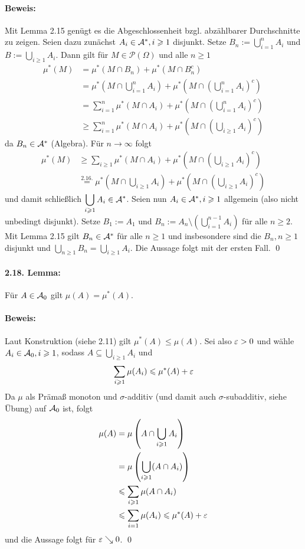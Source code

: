 \paragraph{Beweis:}Mit Lemma 2.15 gen\"ugt es die Abgeschlossenheit bzgl. abz\"ahlbarer Durchschnitte zu zeigen. Seien dazu zun\"achst $A_i\in\mathcal{A}^*,i\geqslant1$ disjunkt. Setze $B_n:=\displaystyle\bigcup_{i=1}^nA_i$ und $\displaystyle B:=\bigcup_{i\geq1}A_i$. Dann gilt f\"ur $M\in\mathcal{P}(\Omega)$ und alle $n\geq1$
\begin{align*}
    \mu^*(M)&=\mu^*(M\cap B_n)+\mu^*(M\cap B_n^c)\\
    &=\mu^*\left(M\cap\bigcup_{i=1}^nA_i\right)+\mu^*\left(M\cap\left(\bigcup_{i=1}^nA_i\right)^c\right)\\
    &=\sum_{i=1}^n\mu^*(M\cap A_i)+\mu^*\left(M\cap\left(\bigcup_{i=1}^nA_i\right)^c\right)\\
    &\geq\sum_{i=1}^n\mu^*(M\cap A_i)+\mu^*\left(M\cap\left(\bigcup_{i\geq1}A_i\right)^c\right)
\end{align*}
da $B_n\in\mathcal{A}^*$ (Algebra). F\"ur $n\to\infty$ folgt 
\begin{align*}
    \mu^*(M)&\geq\sum_{i\geq1}\mu^*(M\cap A_i)+\mu^*\left(M\cap\left(\bigcup_{i\geq1}A_i\right)^c\right)\\
    &\overset{2.16.}{=}\mu^*\left(M\cap\bigcup_{i\geq1}A_i\right)+\mu^*\left(M\cap\left(\bigcup_{i\geq1}A_i\right)^c\right)
\end{align*}
und damit schlie\ss{}lich $\displaystyle\bigcup_{i\geqslant1}A_i\in\mathcal{A}^*$.\newline\newline
Seien nun $A_i\in\mathcal{A}^*,i\geqslant1$ allgemein (also nicht unbedingt disjunkt). Setze $B_1:=A_1$ und $\displaystyle B_n:=A_n\setminus\left(\bigcup_{i=1}^{n-1}A_i\right)$ f\"ur alle $n\geq2$. Mit Lemma 2.15 gilt $B_n\in\mathcal{A}^*$ f\"ur alle $n\geq1$ und insbesondere sind die $B_n,n\geq1$ disjunkt und $\displaystyle\bigcup_{n\geq1}B_n=\bigcup_{i\geq1}A_i$. Die Aussage folgt mit der ersten Fall. \qed

\paragraph{2.18. Lemma:}F\"ur $A\in\mathcal{A}_0$ gilt $\mu(A)=\mu^*(A)$.

\paragraph{Beweis:}Laut Konstruktion (siehe 2.11) gilt $\mu^*(A)\leq\mu(A)$. Sei also $\varepsilon>0$ und w\"ahle $A_i\in\mathcal{A}_0,i\geqslant1$, sodass $A\displaystyle\subseteq\bigcup_{i\geq1}A_i$ und
$$\sum_{i\geqslant1}\mu(A_i)\leqslant\mu^*(A)+\varepsilon$$
Da $\mu$ als Pr\"ama\ss{} monoton und $\sigma$-additiv (und damit auch $\sigma$-subadditiv, siehe \"Ubung) auf $\mathcal{A}_0$ ist, folgt
\begin{align*}
    \mu(A)&=\mu\left(A\cap\bigcup_{i\geqslant1}A_i\right)\\&=\mu\left(\bigcup_{i\geqslant1}(A\cap A_i)\right)\\&\leqslant\sum_{i\geqslant1}\mu(A\cap A_i)\\
    &\leqslant\sum_{i=1}\mu(A_i)\leqslant\mu^*(A)+\varepsilon
\end{align*}
und die Aussage folgt f\"ur $\varepsilon\searrow0$. \qed

